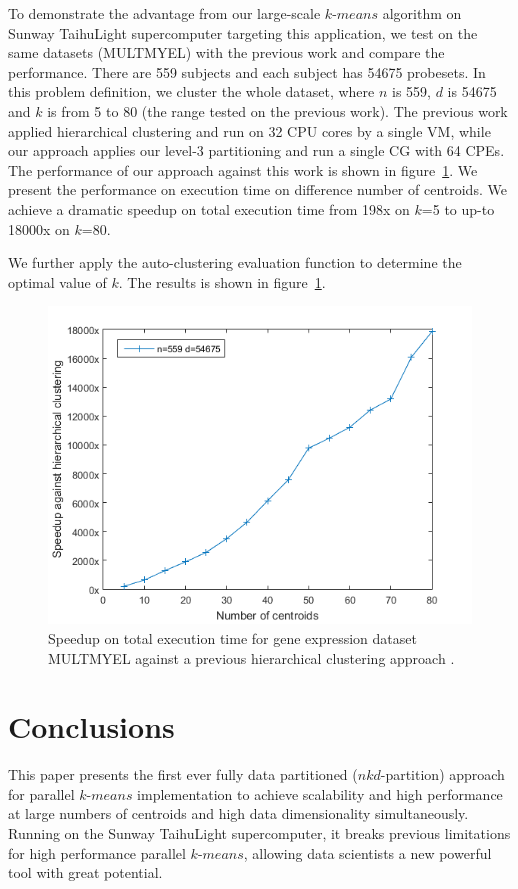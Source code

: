 \documentclass[10pt,journal,compsoc]{IEEEtran}
\begin{document}
To demonstrate the advantage from our large-scale $k$-$means$ algorithm on Sunway TaihuLight supercomputer targeting this application, we test on the same datasets (MULTMYEL) \cite{genedata} with the previous work \cite{wang2014optimising} and compare the performance. There are 559 subjects and each subject has 54675 probesets. In this problem definition, we cluster the whole dataset, where $n$ is 559, $d$ is 54675 and $k$ is from 5 to 80 (the range tested on the previous work). The previous work applied hierarchical clustering and run on 32 CPU cores by a single VM, while our approach applies our level-3 partitioning and run a single CG with 64 CPEs. The performance of our approach against this work is shown in figure~\ref{compare_g}. We present the performance on execution time on difference number of centroids. We achieve a dramatic speedup on total execution time from 198x on $k$=5 to up-to 18000x on $k$=80. 

We further apply the auto-clustering evaluation function to determine the optimal value of $k$. The results is shown in figure~\ref{}.

\begin{figure}
\centering
\includegraphics[scale=0.50]{compare.png}
\caption{ Speedup on total execution time for gene expression dataset MULTMYEL \cite{genedata} against a previous hierarchical clustering approach \cite{wang2014optimising}.
}
\label{compare_g}
\end{figure}

\section{Conclusions}
This paper presents the first ever fully data partitioned ($nkd$-partition) approach for parallel $k$-$means$ implementation to achieve scalability and high performance at large numbers of centroids and high data dimensionality simultaneously. Running on the Sunway TaihuLight supercomputer, it breaks previous limitations for high performance parallel $k$-$means$, allowing data scientists a new powerful tool with great potential.
\end{document}
